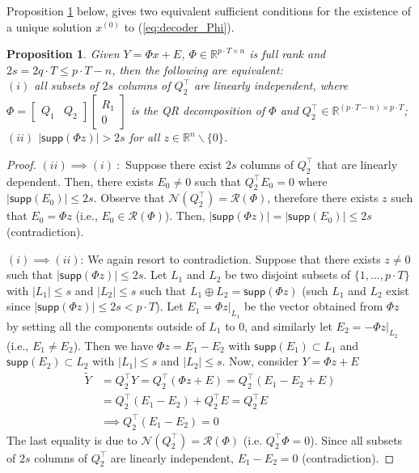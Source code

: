 \documentclass[journal]{IEEEtran}
\newtheorem{prop}{\bf{Proposition}}
\begin{document}
Proposition \ref{prop:equivalent} below, gives two equivalent sufficient conditions for the existence of a unique solution $x^{(0)}$ to (\ref{eq:decoder_Phi}).

\begin{prop} \label{prop:equivalent}
Given $Y=\Phi x + E$, $\Phi \in \mathbb{R}^{p\cdot T \times n}$ is full rank and $2s = 2q\cdot T \leq  p\cdot T-n$, then the following are equivalent: \\$(i)$ all subsets of $2s$ columns of $Q_2 ^\top$ are linearly independent, where  $\Phi = \begin{bmatrix} Q_1 & Q_2 \end{bmatrix} \begin{bmatrix} R_1 \\ 0 \end{bmatrix}$ is the QR decomposition of $\Phi$ and $Q_2 ^\top \in \mathbb{R}^{(p\cdot T-n)\times p\cdot T}$;\\
$(ii)$ $\lvert \textsf{supp}( \Phi z) \rvert > 2 s$ for all $z \in \mathbb{R}^n \backslash \{ 0 \}$.
\end{prop}
\begin{proof}
$(ii) \implies (i)~:$ Suppose there exist $2s$ columns of $Q_2^\top$ that are linearly dependent. Then, there exists $E_0 \neq 0$ such that $Q_2^\top E_0 = 0$ where $\lvert \textsf{supp}(E_0) \rvert \le 2s$. Observe that $\mathcal{N}(Q_2^\top) = \mathcal{R}(\Phi)$, therefore there exists $z$ such that $E_0 = \Phi z$ (i.e., $E_0 \in \mathcal{R}(\Phi)$). Then, $ \lvert  \textsf{supp}(\Phi z) \rvert = \lvert \textsf {supp} (E_0) \rvert \le 2s $ (contradiction).

$(i) \implies (ii)$: We again resort to contradiction. Suppose that there exists $z\neq 0$ such that $\lvert \textsf{supp}(\Phi z)\rvert \le 2s$. Let $L_1$ and $L_2$ be two disjoint subsets of $\{1,..., p\cdot T \}$ with $\lvert L_1 \rvert \le s$ and $\lvert L_2 \rvert \le s$ such that $L_1 \oplus L_2 = \textsf{supp}(\Phi z)$ (such $L_1$ and $L_2$ exist since $\lvert \textsf{supp}(\Phi z) \rvert \le 2s < p\cdot T$). Let $E_1 = \Phi z \lvert _{L_1}$ be the vector obtained from $\Phi z$ by setting all the components outside of $L_1$ to 0, and similarly let $E_2= - \Phi z \lvert _{L_2}$ (i.e., $E_1 \neq E_2$). Then we have $\Phi z = E_1 - E_2$ with $\textsf{supp}(E_1) \subset L_1$ and $\textsf{supp}(E_2) \subset L_2$ with $\lvert L_1 \rvert \le s$ and $\lvert L_2 \rvert \le s$. Now, consider $Y=\Phi z + E$
\begin{equation}
\begin{aligned}
	\tilde Y &= Q_2^\top Y =  Q_2^\top (\Phi z+E) =  Q_2^\top (E_1 - E_2 + E  ) \\
	& =  Q_2^\top(E_1-E_2) +  Q_2^\top E =  Q_2^\top E \\
	& \implies  Q_2^\top (E_1-E_2) = 0 \nonumber 
\end{aligned}
\end{equation}
The last equality is due to $\mathcal{N}(Q_2^\top) = \mathcal{R}(\Phi)$ (i.e. $Q_2^\top \Phi = 0$). Since all subsets of $2s$ columns of $Q_2^\top$ are linearly independent, $E_1 - E_2 = 0 $ (contradiction).
\end{proof}
\end{document}
